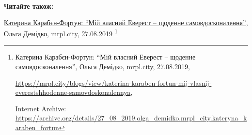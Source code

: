  
 
 
 
 

\def\pubIA{https://archive.org/details/27_08_2019.olga_demidko.mrpl_city.kateryna_karaben_fortun}
\def\pubTitle{Катерина Карабєн-Фортун: \enquote{Мій власний Еверест – щоденне самовдосконалення}}
\def\pubDate{27.08.2019}
\def\pubOrigin{https://mrpl.city/blogs/view/katerina-karaben-fortun-mij-vlasnij-everestshhodenne-samovdoskonalennya}
\def\pubAuthor{Ольга Демідко}

\textbf{Читайте також:}\par\href{\pubIA}{%
\pubTitle, \pubAuthor, mrpl.city, \pubDate}%
\footnote{\pubTitle, \pubAuthor, mrpl.city, \pubDate, \par\url{\pubOrigin}, \par Internet Archive: \url{\pubIA}}

